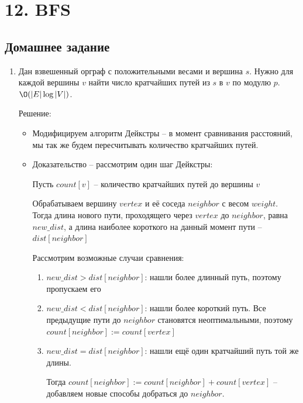 \section{12. BFS}

\subsection{Домашнее задание}
\begin{enumerate}
  \item
    Дан взвешенный орграф с положительными весами и вершина $s$.
    Нужно для каждой вершины $v$ найти число кратчайших путей из $s$ в $v$ по модулю $p$. $\O(|E| \log |V|)$.

    Решение:

    \begin{itemize}
      \item Модифицируем алгоритм Дейкстры -- в момент сравнивания расстояний, 
      мы так же будем пересчитывать количество кратчайших путей.

      \item Доказательство -- рассмотрим один шаг Дейкстры:
      
      Пусть $count[v]$ -- количество кратчайших путей до вершины $v$
      
      Обрабатываем вершину $vertex$ и её соседа $neighbor$ с весом $weight$.
      Тогда длина нового пути, проходящего через $vertex$ до $neighbor$, равна $new\_dist$, а длина наиболее короткого на данный момент пути -- $dist[neighbor]$

      Рассмотрим возможные случаи сравнения:
      
      \begin{enumerate}
        \item $new\_dist > dist[neighbor]$: нашли более длинный путь, поэтому пропускаем его

        \item $new\_dist < dist[neighbor]$: нашли более короткий путь.
        Все предыдущие пути до $neighbor$ становятся неоптимальными, поэтому $count[neighbor] := count[vertex]$

        \item $new\_dist = dist[neighbor]$: нашли ещё один кратчайший путь той же длины.
        
        Тогда $count[neighbor] := count[neighbor] + count[vertex]$ -- добавляем новые способы добраться до $neighbor$.
      \end{enumerate}


\end{itemize}
\end{enumerate}
